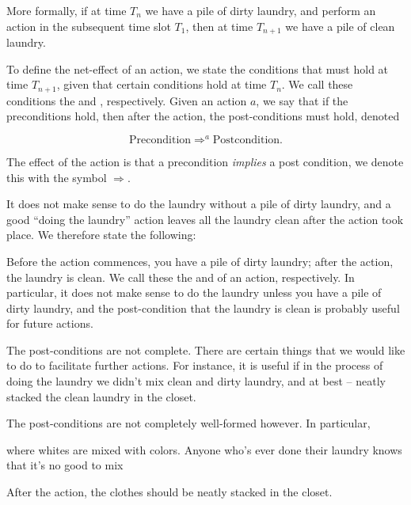 More formally, if at time $T_n$ we
have a pile of dirty laundry, and perform an action in the subsequent time slot
$T_1$, then at time $T_{n+1}$ we have a pile of clean laundry.


To define the
net-effect of an action, we state the conditions that must hold at time
$T_{n+1}$, given that certain conditions hold at time $T_n$. We call these
conditions the  and , respectively. Given an
action $a$, we say that if the preconditions hold, then after the action, the
post-conditions must hold, denoted

\begin{equation}
\text{Precondition} \Rightarrow^a \text{Postcondition}.
\end{equation}


The effect
of the action is that a precondition \emph{implies} a post condition, we denote
this with the symbol $\Rightarrow$.

It does not make sense to do the laundry without a pile of dirty laundry, and a
good ``doing the laundry'' action leaves all the laundry clean after the action
took place. We therefore state the following:

 Before the action
commences, you have a pile of dirty laundry; after the action, the laundry is
clean. We call these the  and  of an action,
respectively. In particular, it does not make sense to do the laundry unless
you have a pile of dirty laundry, and the post-condition that the laundry is
clean is probably useful for future actions.

The post-conditions are not complete. There are certain things that we would
like to do to facilitate further actions. For instance, it is useful if in the
process of doing the laundry we didn't mix clean and dirty laundry, and at best
-- neatly stacked the clean laundry in the closet.


The post-conditions are not
completely well-formed however. In particular, 

where whites are mixed with
colors. Anyone who's ever done their laundry knows that it's no good to mix 

After the action, the clothes should be neatly stacked in the closet. 

